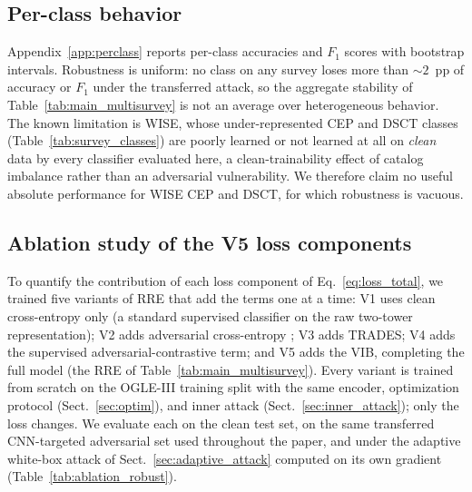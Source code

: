 \documentclass{aa}
\begin{document}
\subsection{Per-class behavior}
\label{sec:per_class_main}

Appendix~\ref{app:perclass} reports per-class accuracies and $F_1$ scores with bootstrap intervals. Robustness is uniform: no class on any survey loses more than ${\sim}2$~pp of accuracy or $F_1$ under the transferred attack, so the aggregate stability of Table~\ref{tab:main_multisurvey} is not an average over heterogeneous behavior. The known limitation is WISE, whose under-represented CEP and DSCT classes (Table~\ref{tab:survey_classes}) are poorly learned or not learned at all on \emph{clean} data by every classifier evaluated here, a clean-trainability effect of catalog imbalance rather than an adversarial vulnerability. We therefore claim no useful absolute performance for WISE CEP and DSCT, for which robustness is vacuous.

\subsection{Ablation study of the V5 loss components}
\label{sec:ablation}


To quantify the contribution of each loss component of
Eq.~\eqref{eq:loss_total}, we trained five variants of RRE that add the
terms one at a time: V1 uses clean cross-entropy only (a standard
supervised classifier on the raw two-tower representation); V2 adds
adversarial cross-entropy \citep[Madry-style adversarial
training;][]{madry2017towards}; V3 adds TRADES; V4 adds the supervised
adversarial-contrastive term; and V5 adds the VIB, completing the full
model (the RRE of Table~\ref{tab:main_multisurvey}). Every variant is
trained from scratch on the OGLE-III training split with the same
encoder, optimization protocol (Sect.~\ref{sec:optim}), and inner attack
(Sect.~\ref{sec:inner_attack}); only the loss changes. We evaluate each on
the clean test set, on the same transferred CNN-targeted adversarial set
used throughout the paper, and under the adaptive white-box attack of
Sect.~\ref{sec:adaptive_attack} computed on its own gradient
(Table~\ref{tab:ablation_robust}).
\end{document}
